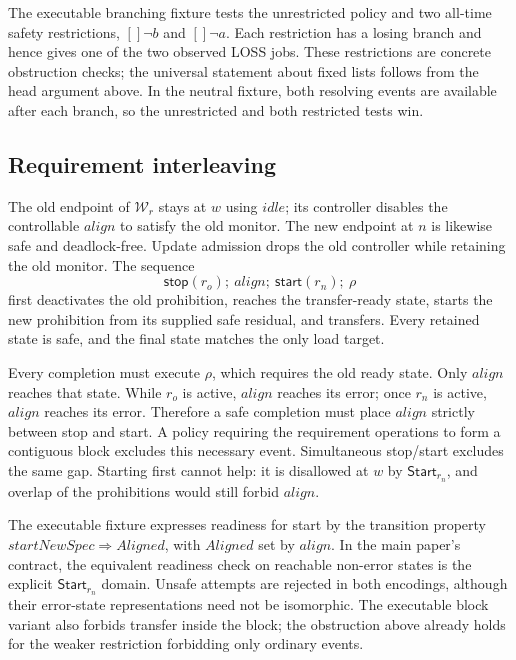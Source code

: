 \documentclass[11pt]{article}
\newcommand{\ustart}[1]{\mathsf{start}(#1)}
\newcommand{\ustop}[1]{\mathsf{stop}(#1)}
\begin{document}
The executable branching fixture tests the unrestricted policy and two all-time safety restrictions, $[]\neg b$ and $[]\neg a$. Each restriction has a losing branch and hence gives one of the two observed LOSS jobs. These restrictions are concrete obstruction checks; the universal statement about fixed lists follows from the head argument above. In the neutral fixture, both resolving events are available after each branch, so the unrestricted and both restricted tests win.

\subsection{Requirement interleaving}
The old endpoint of $\mathcal W_r$ stays at $w$ using $idle$; its controller disables the controllable $align$ to satisfy the old monitor. The new endpoint at $n$ is likewise safe and deadlock-free. Update admission drops the old controller while retaining the old monitor. The sequence
\[
  \ustop{r_o};\ align;\ \ustart{r_n};\ \rho
\]
first deactivates the old prohibition, reaches the transfer-ready state, starts the new prohibition from its supplied safe residual, and transfers. Every retained state is safe, and the final state matches the only load target.

Every completion must execute $\rho$, which requires the old ready state. Only $align$ reaches that state. While $r_o$ is active, $align$ reaches its error; once $r_n$ is active, $align$ reaches its error. Therefore a safe completion must place $align$ strictly between stop and start. A policy requiring the requirement operations to form a contiguous block excludes this necessary event. Simultaneous stop/start excludes the same gap. Starting first cannot help: it is disallowed at $w$ by $\mathsf{Start}_{r_n}$, and overlap of the prohibitions would still forbid $align$.

The executable fixture expresses readiness for start by the transition property $startNewSpec\Rightarrow Aligned$, with $Aligned$ set by $align$. In the main paper's contract, the equivalent readiness check on reachable non-error states is the explicit $\mathsf{Start}_{r_n}$ domain. Unsafe attempts are rejected in both encodings, although their error-state representations need not be isomorphic. The executable block variant also forbids transfer inside the block; the obstruction above already holds for the weaker restriction forbidding only ordinary events.
\end{document}
